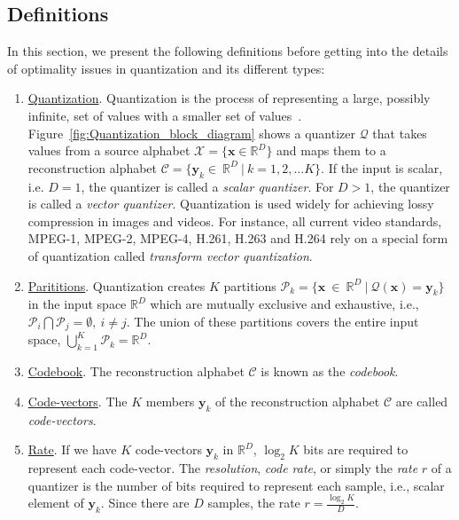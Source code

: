 \begin{Body}
\section{Definitions}
\label{sec:definitions}
In this section, we present the following definitions before getting into the details of optimality issues in quantization and its different types:

\begin{enumerate}
\item \underline{Quantization}.  Quantization is the process of representing a large, possibly infinite, set of values with a smaller set of values~\cite{2005_BOOK_DataCompression_Sayood}.  Figure~\ref{fig:Quantization_block_diagram} shows a quantizer $\mathcal{Q}$ that takes values from a source alphabet $\mathcal{X}=\{\mathbf{x} \in \mathbb{R}^D\}$ and maps them to a reconstruction alphabet $\mathcal{C}=\{\mathbf{y}_k \in \ \mathbb{R}^D \ | \ k=1,2, \ldots K\}$.  If the input is scalar, i.e. $D=1$, the quantizer is called a \emph{scalar quantizer}.  For $D>1$, the quantizer is called a \emph{vector quantizer}.  Quantization is used widely for achieving lossy compression in images and videos.  For instance, all current video standards, MPEG-1, MPEG-2, MPEG-4, H.261, H.263 and H.264 rely on a special form of quantization called \emph{transform vector quantization}.

\item \underline{Parititions}.  Quantization creates $K$ partitions $\mathcal{P}_k = \{\mathbf{x} \ \in \ \mathbb{R}^D \ | \ \mathcal{Q}(\mathbf{x}) = \mathbf{y}_k\}$ in the input space $\mathbb{R}^D$ which are mutually exclusive and exhaustive, i.e., $\mathcal{P}_i \bigcap \mathcal{P}_j = \emptyset, \ i \neq j$.  The union of these partitions covers the entire input space, $\bigcup\limits_{k=1}^{K} \mathcal{P}_k=\mathbb{R}^D$.

\item \underline{Codebook}. The reconstruction alphabet $\mathcal{C}$ is known as the \emph{codebook}.  

\item \underline{Code-vectors}.  The $K$ members $\mathbf{y}_k$ of the reconstruction alphabet $\mathcal{C}$ are called \emph{code-vectors}.    

\item \underline{Rate}.  If we have $K$ code-vectors $\mathbf{y}_k$ in $\mathbb{R}^D$, $\log_2 K$ bits are required to represent each code-vector.   The \emph{resolution}, \emph{code rate}, or simply the \emph{rate} $r$ of a quantizer is the number of bits required to represent each sample, i.e., scalar element of $\mathbf{y}_k$.  Since there are $D$ samples, the rate $r=\frac{\log_2 K}{D}$.  


\end{enumerate}
\end{Body}
